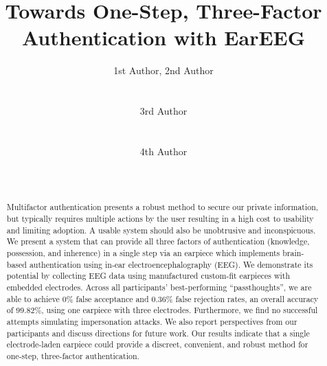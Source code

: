 \documentclass{sigchi}
\begin{document}
\title{Towards One-Step, Three-Factor \\ Authentication with EarEEG}

\author{
  \alignauthor 1st Author, 2nd Author\\
    \\
    \\
  \alignauthor 3rd Author\\
    \\
    \\
  \alignauthor 4th Author\\
    \\
    \\
}

\maketitle

\begin{abstract}
Multifactor authentication presents a robust method to secure our private information, but typically requires multiple actions by the user resulting in a high cost to usability and limiting adoption. A usable system should also be unobtrusive and inconspicuous. We present a system that can provide all three factors of authentication (knowledge, possession, and inherence) in a single step via an earpiece which implements brain-based authentication using in-ear electroencephalography (EEG). We demonstrate its potential by collecting EEG data using manufactured custom-fit earpieces with embedded electrodes. Across all participants’ best-performing “passthoughts”, we are able to achieve 0\% false acceptance and 0.36\% false rejection rates, an overall accuracy of 99.82\%, using one earpiece with three electrodes. Furthermore, we find no successful attempts simulating impersonation attacks. We also report perspectives from our participants and discuss directions for future work. Our results indicate that a single electrode-laden earpiece could provide a discreet, convenient, and robust method for one-step, three-factor authentication.

\end{abstract}


\end{document}

